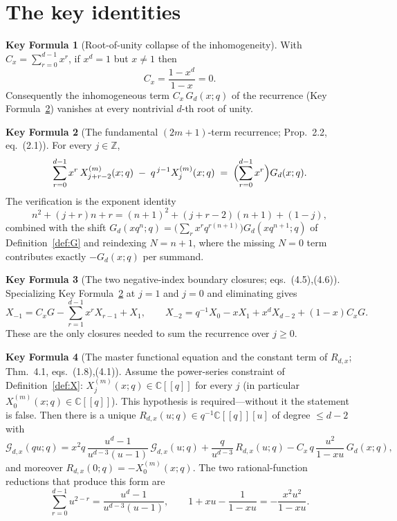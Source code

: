 \documentclass[11pt]{article}
\newcommand{\C}{\mathbb{C}}
\newcommand{\Z}{\mathbb{Z}}
\newcommand{\GG}{\mathcal{G}}
\theoremstyle{definition}
\newtheorem{keyformula}{Key Formula}
\begin{document}
\section*{The key identities}

\begin{keyformula}[Root-of-unity collapse of the inhomogeneity]\label{KF:collapse}
With $C_x=\sum_{r=0}^{d-1}x^r$, if $x^d=1$ but $x\ne1$ then
\[
C_x=\frac{1-x^d}{1-x}=0 .
\]
Consequently the inhomogeneous term $C_x\,G_d(x;q)$ of the recurrence
(Key Formula~\ref{KF:recurrence}) vanishes at every nontrivial $d$-th root of unity.
\end{keyformula}

\begin{keyformula}[The fundamental $(2m+1)$-term recurrence; Prop.~2.2, eq.~(2.1)]\label{KF:recurrence}
For every $j\in\Z$,
\[
\sum_{r=0}^{d-1}x^r\,X_{j+r-2}^{(m)}(x;q)\;-\;q^{\,j-1}X_j^{(m)}(x;q)
\;=\;\Bigl(\sum_{r=0}^{d-1}x^r\Bigr)G_d(x;q).
\]
The verification is the exponent identity
\[
n^2+(j+r)n+r=(n+1)^2+(j+r-2)(n+1)+(1-j),
\]
combined with the shift $G_d(xq^n;q)=\bigl(\sum_r x^rq^{r(n+1)}\bigr)G_d(xq^{n+1};q)$ of
Definition~\ref{def:G} and reindexing $N=n+1$, where the missing $N=0$ term contributes
exactly $-G_d(x;q)$ per summand.
\end{keyformula}

\begin{keyformula}[The two negative-index boundary closures; eqs.~(4.5),(4.6)]\label{KF:boundary}
Specializing Key Formula~\ref{KF:recurrence} at $j=1$ and $j=0$ and eliminating gives
\[
X_{-1}=C_xG-\sum_{r=1}^{d-1}x^rX_{r-1}+X_1,
\qquad
X_{-2}=q^{-1}X_0-xX_1+x^dX_{d-2}+(1-x)C_xG .
\]
These are the only closures needed to sum the recurrence over $j\ge0$.
\end{keyformula}

\begin{keyformula}[The master functional equation and the constant term of $R_{d,x}$; Thm.~4.1, eqs.~(1.8),(4.1)]\label{KF:functional}
Assume the power-series constraint of Definition~\ref{def:X}: $X_j^{(m)}(x;q)\in\C[[q]]$ for
every $j$ (in particular $X_0^{(m)}(x;q)\in\C[[q]]$). This hypothesis is required---without it
the statement is false. Then there is a unique $R_{d,x}(u;q)\in q^{-1}\C[[q]][u]$ of degree
$\le d-2$ with
\[
\GG_{d,x}(qu;q)
=x^2q\,\frac{u^d-1}{u^{d-3}(u-1)}\,\GG_{d,x}(u;q)
+\frac{q}{u^{d-3}}\,R_{d,x}(u;q)
-C_x\,q\,\frac{u^2}{1-xu}\,G_d(x;q),
\]
and moreover $R_{d,x}(0;q)=-X_0^{(m)}(x;q)$. The two rational-function reductions that produce
this form are
\[
\sum_{r=0}^{d-1}u^{2-r}=\frac{u^d-1}{u^{d-3}(u-1)},
\qquad
1+xu-\frac{1}{1-xu}=-\frac{x^2u^2}{1-xu}.
\]
\end{keyformula}
\end{document}
